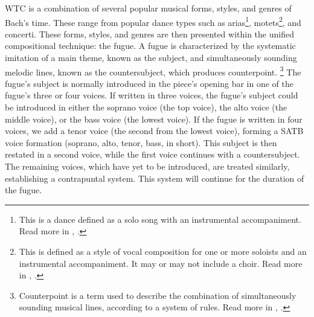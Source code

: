 WTC is a combination of several popular musical forms, styles, and genres of Bach's time. These range from popular dance types such as arias\footnote{This is a dance defined as a solo song with an instrumental accompaniment. Read more in \citeauthor{Marshall_Emery_2019}, \citeyear{Marshall_Emery_2019}.}, motets\footnote{This is defined as a style of vocal composition for one or more soloists and an instrumental accompaniment. It may or may not include a choir. Read more in \citeauthor{Marshall_Emery_2019}, \citeyear{Marshall_Emery_2019}.}, and concerti. These forms, styles, and genres are then presented within the unified compositional technique: the fugue. A fugue is characterized by the systematic imitation of a main theme, known as the subject, and simultaneously sounding melodic lines, known as the countersubject, which produces counterpoint. \autocite{Marshall_Emery_2019}\footnote{Counterpoint is a term used to describe the combination of simultaneously sounding musical lines, according to a system of rules. Read more in \citeauthor{Sachs_Dahlhaus_2001}, \citeyear{Sachs_Dahlhaus_2001}.} The fugue's subject is normally introduced in the piece's opening bar in one of the fugue's three or four voices. If written in three voices, the fugue's subject could be introduced in either the soprano voice (the top voice), the alto voice (the middle voice), or the bass voice (the lowest voice). If the fugue is written in four voices, we add a tenor voice (the second from the lowest voice), forming a SATB voice formation (soprano, alto, tenor, bass, in short). This subject is then restated in a second voice, while the first voice continues with a countersubject. The remaining voices, which have yet to be introduced, are treated similarly, establishing a contrapuntal system. This system will continue for the duration of the fugue.

